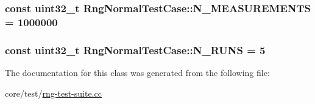 \subsubsection[{\texorpdfstring{N\+\_\+\+M\+E\+A\+S\+U\+R\+E\+M\+E\+N\+TS}{N_MEASUREMENTS}}]{\setlength{\rightskip}{0pt plus 5cm}const uint32\+\_\+t Rng\+Normal\+Test\+Case\+::\+N\+\_\+\+M\+E\+A\+S\+U\+R\+E\+M\+E\+N\+TS = 1000000\hspace{0.3cm}{\ttfamily [static]}}\hypertarget{classRngNormalTestCase_a3e7f658aca3704a9b93cfe8cd7d7d888}{}\label{classRngNormalTestCase_a3e7f658aca3704a9b93cfe8cd7d7d888}
\subsubsection[{\texorpdfstring{N\+\_\+\+R\+U\+NS}{N_RUNS}}]{\setlength{\rightskip}{0pt plus 5cm}const uint32\+\_\+t Rng\+Normal\+Test\+Case\+::\+N\+\_\+\+R\+U\+NS = 5\hspace{0.3cm}{\ttfamily [static]}}\hypertarget{classRngNormalTestCase_a5f0643e09cb098d4691f53cc7305ddf9}{}\label{classRngNormalTestCase_a5f0643e09cb098d4691f53cc7305ddf9}


The documentation for this class was generated from the following file\+:\begin{DoxyCompactItemize}
\item 
core/test/\hyperlink{rng-test-suite_8cc}{rng-\/test-\/suite.\+cc}\end{DoxyCompactItemize}
